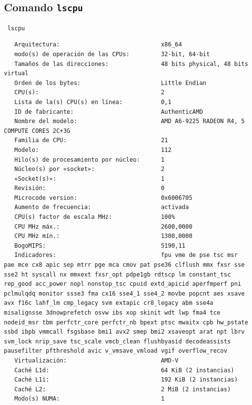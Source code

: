 \documentclass{article}
\begin{document}
\subsection{Comando \texttt{lscpu}}
\label{sec:org538b9d0}
\begin{verbatim}
 lscpu
\end{verbatim}

\label{orgd47c029}
\begin{verbatim}
   Arquitectura:                             x86_64
   modo(s) de operación de las CPUs:         32-bit, 64-bit
   Tamaños de las direcciones:               48 bits physical, 48 bits virtual
   Orden de los bytes:                       Little Endian
   CPU(s):                                   2
   Lista de la(s) CPU(s) en línea:           0,1
   ID de fabricante:                         AuthenticAMD
   Nombre del modelo:                        AMD A6-9225 RADEON R4, 5 COMPUTE CORES 2C+3G
   Familia de CPU:                           21
   Modelo:                                   112
   Hilo(s) de procesamiento por núcleo:      1
   Núcleo(s) por «socket»:                   2
   «Socket(s)»:                              1
   Revisión:                                 0
   Microcode version:                        0x6006705
   Aumento de frecuencia:                    activada
   CPU(s) factor de escala MHz:              100%
   CPU MHz máx.:                             2600,0000
   CPU MHz mín.:                             1300,0000
   BogoMIPS:                                 5190,11
   Indicadores:                              fpu vme de pse tsc msr pae mce cx8 apic sep mtrr pge mca cmov pat pse36 clflush mmx fxsr sse sse2 ht syscall nx mmxext fxsr_opt pdpe1gb rdtscp lm constant_tsc rep_good acc_power nopl nonstop_tsc cpuid extd_apicid aperfmperf pni pclmulqdq monitor ssse3 fma cx16 sse4_1 sse4_2 movbe popcnt aes xsave avx f16c lahf_lm cmp_legacy svm extapic cr8_legacy abm sse4a misalignsse 3dnowprefetch osvw ibs xop skinit wdt lwp fma4 tce nodeid_msr tbm perfctr_core perfctr_nb bpext ptsc mwaitx cpb hw_pstate ssbd ibpb vmmcall fsgsbase bmi1 avx2 smep bmi2 xsaveopt arat npt lbrv svm_lock nrip_save tsc_scale vmcb_clean flushbyasid decodeassists pausefilter pfthreshold avic v_vmsave_vmload vgif overflow_recov
   Virtualización:                           AMD-V
   Caché L1d:                                64 KiB (2 instancias)
   Caché L1i:                                192 KiB (2 instancias)
   Caché L2:                                 2 MiB (2 instancias)
   Modo(s) NUMA:                             1

\end{verbatim}
\end{document}
